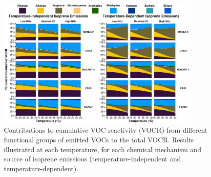 \documentclass[11pt,a4paper]{article}
\begin{document}
\begin{figure}[ht]
    \centering
    \caption{Contributions to cumulative VOC reactivity (VOCR) from different functional groups of emitted VOCs to the total VOCR. Results illustrated at each temperature, for each chemical mechanism and source of isoprene emissions (temperature-independent and temperature-dependent).}
    \includegraphics[width = 0.9\textwidth]{img/Sum_VOCR_percent}
\end{figure}

\newpage
\end{document}
